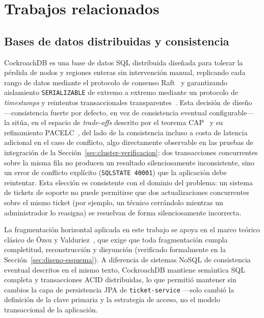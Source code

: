 \documentclass[11pt,letterpaper]{article}
\begin{document}
\section{Trabajos relacionados}
\label{sec:trabajos-relacionados}

\subsection{Bases de datos distribuidas y consistencia}

CockroachDB es una base de datos SQL distribuida diseñada para tolerar la pérdida de nodos y
regiones enteras sin intervención manual, replicando cada rango de datos mediante el protocolo de
consenso Raft~\cite{ongaro2014raft} y garantizando aislamiento \texttt{SERIALIZABLE} de extremo a
extremo mediante un protocolo de \emph{timestamps} y reintentos transaccionales
transparentes~\cite{taft2020cockroachdb}. Esta decisión de diseño —consistencia fuerte por
defecto, en vez de consistencia eventual configurable— la sitúa, en el espacio de \emph{trade-offs}
descrito por el teorema CAP~\cite{brewer2012cap} y su refinamiento
PACELC~\cite{abadi2012consistency}, del lado de la consistencia incluso a costa de latencia
adicional en el caso de conflicto, algo directamente observable en las pruebas de integración de
la Sección~\ref{sec:cluster-verificacion}: dos transacciones concurrentes sobre la misma fila no
producen un resultado silenciosamente inconsistente, sino un error de conflicto explícito
(\texttt{SQLSTATE 40001}) que la aplicación debe reintentar. Esta elección es consistente con el
dominio del problema: un sistema de tickets de soporte no puede permitirse que dos actualizaciones
concurrentes sobre el mismo ticket (por ejemplo, un técnico cerrándolo mientras un administrador lo
reasigna) se resuelvan de forma silenciosamente incorrecta.

La fragmentación horizontal aplicada en este trabajo se apoya en el marco teórico clásico de
Özsu y Valduriez~\cite{ozsu2011principles}, que exige que toda fragmentación cumpla completitud,
reconstrucción y disyunción (verificado formalmente en la Sección~\ref{sec:diseno-esquema}). A
diferencia de sistemas NoSQL de consistencia eventual descritos en el mismo texto, CockroachDB
mantiene semántica SQL completa y transacciones ACID distribuidas, lo que permitió mantener sin
cambios la capa de persistencia JPA de \texttt{ticket-service} —solo cambió la definición de la
clave primaria y la estrategia de acceso, no el modelo transaccional de la aplicación.
\end{document}
